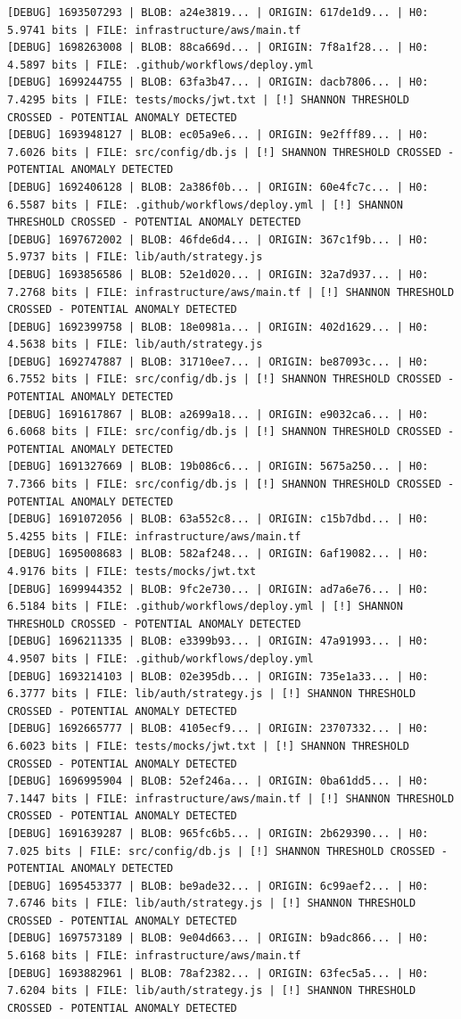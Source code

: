 \documentclass[12pt, a4paper, oneside]{report}
\begin{document}
\begin{lstlisting}[basicstyle=\tiny\ttfamily]
[DEBUG] 1693507293 | BLOB: a24e3819... | ORIGIN: 617de1d9... | H0: 5.9741 bits | FILE: infrastructure/aws/main.tf
[DEBUG] 1698263008 | BLOB: 88ca669d... | ORIGIN: 7f8a1f28... | H0: 4.5897 bits | FILE: .github/workflows/deploy.yml
[DEBUG] 1699244755 | BLOB: 63fa3b47... | ORIGIN: dacb7806... | H0: 7.4295 bits | FILE: tests/mocks/jwt.txt | [!] SHANNON THRESHOLD CROSSED - POTENTIAL ANOMALY DETECTED
[DEBUG] 1693948127 | BLOB: ec05a9e6... | ORIGIN: 9e2fff89... | H0: 7.6026 bits | FILE: src/config/db.js | [!] SHANNON THRESHOLD CROSSED - POTENTIAL ANOMALY DETECTED
[DEBUG] 1692406128 | BLOB: 2a386f0b... | ORIGIN: 60e4fc7c... | H0: 6.5587 bits | FILE: .github/workflows/deploy.yml | [!] SHANNON THRESHOLD CROSSED - POTENTIAL ANOMALY DETECTED
[DEBUG] 1697672002 | BLOB: 46fde6d4... | ORIGIN: 367c1f9b... | H0: 5.9737 bits | FILE: lib/auth/strategy.js
[DEBUG] 1693856586 | BLOB: 52e1d020... | ORIGIN: 32a7d937... | H0: 7.2768 bits | FILE: infrastructure/aws/main.tf | [!] SHANNON THRESHOLD CROSSED - POTENTIAL ANOMALY DETECTED
[DEBUG] 1692399758 | BLOB: 18e0981a... | ORIGIN: 402d1629... | H0: 4.5638 bits | FILE: lib/auth/strategy.js
[DEBUG] 1692747887 | BLOB: 31710ee7... | ORIGIN: be87093c... | H0: 6.7552 bits | FILE: src/config/db.js | [!] SHANNON THRESHOLD CROSSED - POTENTIAL ANOMALY DETECTED
[DEBUG] 1691617867 | BLOB: a2699a18... | ORIGIN: e9032ca6... | H0: 6.6068 bits | FILE: src/config/db.js | [!] SHANNON THRESHOLD CROSSED - POTENTIAL ANOMALY DETECTED
[DEBUG] 1691327669 | BLOB: 19b086c6... | ORIGIN: 5675a250... | H0: 7.7366 bits | FILE: src/config/db.js | [!] SHANNON THRESHOLD CROSSED - POTENTIAL ANOMALY DETECTED
[DEBUG] 1691072056 | BLOB: 63a552c8... | ORIGIN: c15b7dbd... | H0: 5.4255 bits | FILE: infrastructure/aws/main.tf
[DEBUG] 1695008683 | BLOB: 582af248... | ORIGIN: 6af19082... | H0: 4.9176 bits | FILE: tests/mocks/jwt.txt
[DEBUG] 1699944352 | BLOB: 9fc2e730... | ORIGIN: ad7a6e76... | H0: 6.5184 bits | FILE: .github/workflows/deploy.yml | [!] SHANNON THRESHOLD CROSSED - POTENTIAL ANOMALY DETECTED
[DEBUG] 1696211335 | BLOB: e3399b93... | ORIGIN: 47a91993... | H0: 4.9507 bits | FILE: .github/workflows/deploy.yml
[DEBUG] 1693214103 | BLOB: 02e395db... | ORIGIN: 735e1a33... | H0: 6.3777 bits | FILE: lib/auth/strategy.js | [!] SHANNON THRESHOLD CROSSED - POTENTIAL ANOMALY DETECTED
[DEBUG] 1692665777 | BLOB: 4105ecf9... | ORIGIN: 23707332... | H0: 6.6023 bits | FILE: tests/mocks/jwt.txt | [!] SHANNON THRESHOLD CROSSED - POTENTIAL ANOMALY DETECTED
[DEBUG] 1696995904 | BLOB: 52ef246a... | ORIGIN: 0ba61dd5... | H0: 7.1447 bits | FILE: infrastructure/aws/main.tf | [!] SHANNON THRESHOLD CROSSED - POTENTIAL ANOMALY DETECTED
[DEBUG] 1691639287 | BLOB: 965fc6b5... | ORIGIN: 2b629390... | H0: 7.025 bits | FILE: src/config/db.js | [!] SHANNON THRESHOLD CROSSED - POTENTIAL ANOMALY DETECTED
[DEBUG] 1695453377 | BLOB: be9ade32... | ORIGIN: 6c99aef2... | H0: 7.6746 bits | FILE: lib/auth/strategy.js | [!] SHANNON THRESHOLD CROSSED - POTENTIAL ANOMALY DETECTED
[DEBUG] 1697573189 | BLOB: 9e04d663... | ORIGIN: b9adc866... | H0: 5.6168 bits | FILE: infrastructure/aws/main.tf
[DEBUG] 1693882961 | BLOB: 78af2382... | ORIGIN: 63fec5a5... | H0: 7.6204 bits | FILE: lib/auth/strategy.js | [!] SHANNON THRESHOLD CROSSED - POTENTIAL ANOMALY DETECTED
\end{lstlisting}
\end{document}
